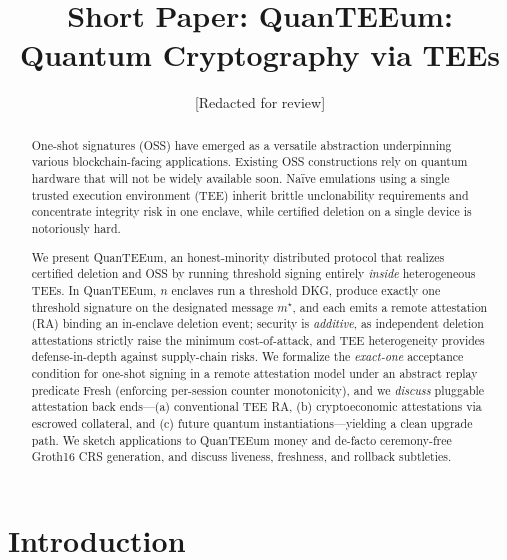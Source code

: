 \documentclass[runningheads,orivec]{llncs}
\newcommand{\prot}{\textsf{QuanTEEum}}
\begin{document}
\title{Short Paper: QuanTEEum: Quantum Cryptography via TEEs}
\author{[Redacted for review]}
\maketitle

\begin{abstract}
One-shot signatures (OSS) have emerged as a versatile abstraction underpinning various blockchain-facing applications. Existing OSS constructions rely on quantum hardware that will not be widely available soon. Naïve emulations using a single trusted execution environment (TEE) inherit brittle unclonability requirements and concentrate integrity risk in one enclave, while certified deletion on a single device is notoriously hard. 

We present \prot{}, an honest-minority distributed protocol that realizes certified deletion and OSS by running threshold signing entirely \emph{inside} heterogeneous TEEs. In \prot{}, $n$ enclaves run a threshold DKG, produce exactly one threshold signature on the designated message $m^{\star}$, and each emits a remote attestation (RA) binding an in-enclave deletion event; security is \emph{additive}, as independent deletion attestations strictly raise the minimum cost\mbox{-}of\mbox{-}attack, and TEE heterogeneity provides defense-in-depth against supply-chain risks. We formalize the \emph{exact-one} acceptance condition for one-shot signing in a remote attestation model under an abstract replay predicate \textsf{Fresh} (enforcing per-session counter monotonicity), and we \emph{discuss} pluggable attestation back ends—(a) conventional TEE RA, (b) cryptoeconomic attestations via escrowed collateral, and (c) future quantum instantiations—yielding a clean upgrade path. We sketch applications to QuanTEEum money and de-facto ceremony-free Groth16 CRS generation, and discuss liveness, freshness, and rollback subtleties. 
\end{abstract}

\section{Introduction}
\end{document}
